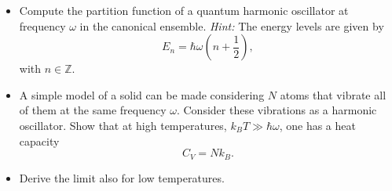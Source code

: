 \begin{Problem}
\begin{itemize}
    \item Compute the partition function of a quantum harmonic oscillator at frequency \( \omega \) in the canonical ensemble. \textit{Hint:} The energy levels are given by
    \[
    E_n = \hbar \omega \left( n + \frac{1}{2} \right),
    \]
    with \( n \in \mathbb{Z} \).
    
    \item A simple model of a solid can be made considering \(N\) atoms that vibrate all of them at the same frequency \( \omega \). Consider these vibrations as a harmonic oscillator. Show that at high temperatures, \( k_B T \gg \hbar \omega \), one has a heat capacity
    \[
    C_V = N k_B.
    \]
    
    \item Derive the limit also for low temperatures.
\end{itemize}
\end{Problem}
